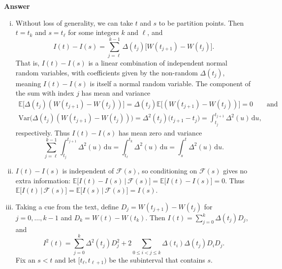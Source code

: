 \documentclass[11pt]{article}
\newcommand\E{\mathbb{E}}
\newcommand\Var{\text{Var}}
\newcommand\cF{\mathcal{F}}
\newenvironment{hwanswer}
    {
        \vspace{2mm}
        {\bfseries Answer}
        \vspace{-\abovedisplayskip}
        \begin{center}
            \begin{tcolorbox}[
                width=0.95\textwidth,
                colback=white,
                colframe=white,
                opacityback=0,
                opacityframe=0,
                boxrule=0pt,
                frame hidden,
                breakable,
                before upper={\parindent15pt} %
            ]
            \lineskip=0pt %
    }
    {
        \end{tcolorbox}
        \end{center}
        \vspace{4mm}
    }
\begin{document}
\begin{hwanswer}
\begin{enumerate}[(i)]
            \item Without loss of generality, we can take $t$ and $s$ to be partition
            points. Then $t = t_{k}$ and $s = t_{\ell}$ for some integers $k$ and $\ell$,
            and
            \[
                I(t)
                -
                I(s)
                =
                \sum_{j=\ell}^{k-1}
                \Delta(t_{j}) \big[ W(t_{j+1}) - W(t_{j}) \big].
            \]
            That is, $I(t) - I(s)$ is a linear combination of independent normal random
            variables, with coefficients given by the non-random $\Delta(t_{j})$, meaning
            $I(t) - I(s)$ is itself a normal random variable. The component of the sum with
            index $j$ has mean and variance
            \[
                \begin{multlined}
                    \E\big[
                        \Delta(t_j) (W(t_{j+1}) - W(t_{j}))
                    \big]
                    =
                    \Delta(t_j)
                    \E\big[
                        (W(t_{j+1}) - W(t_{j}))
                    \big]
                    = 0
                    \qquad \text{and}
                    \\
                    \Var\big(
                        \Delta(t_j) (W(t_{j+1}) - W(t_{j}))
                    \big)
                    =
                    \Delta^2(t_j) \big( t_{j+1} - t_{j} \big)
                    =
                    \int_{t_{j}}^{t_{j+1}}
                    \Delta^2(u) \, \text{d} u,
                \end{multlined}
            \]
            respectively. Thus $I(t) - I(s)$ has mean zero and variance
            \[
                \sum_{j=\ell}^{k-1}
                \int_{t_{j}}^{t_{j+1}}
                \Delta^2(u) \, \text{d} u
                =
                \int_{t_{\ell}}^{t_{k}}
                \Delta^2(u) \, \text{d} u
                =
                \int_{s}^{t}
                \Delta^2(u) \, \text{d} u.
            \]

            \item $I(t) - I(s)$ is independent of $\cF(s)$, so conditioning on $\cF(s)$
            gives no extra information: $\E\big[ I(t) - I(s) \, | \, \cF(s) \big] = \E\big[
            I(t) - I(s) \big] = 0$. Thus $\E\big[ I(t) \, | \, \cF(s) \big] = \E\big[ I(s)
            \, | \, \cF(s) \big] = I(s)$.

            \item Taking a cue from the text, define $D_j = W(t_{j+1}) - W(t_{j})$ for $j =
            0, \dots, k-1$ and $D_{k} = W(t) - W(t_{k})$. Then $I(t) = \sum_{j=0}^{k}
            \Delta(t_{j}) D_j$, and
            \[
                I^2(t)
                =
                \sum_{j=0}^{k}
                \Delta^2(t_j) D_{j}^2
                +
                2
                \sum_{0 \leq i < j \leq k}
                \Delta(t_{i}) \Delta(t_{j})
                D_{i} D_{j}.
            \]
            Fix an $s < t$ and let $[t_{\ell}, t_{\ell+1})$ be the subinterval that contains
            $s$.


\end{enumerate}
\end{hwanswer}
\end{document}
